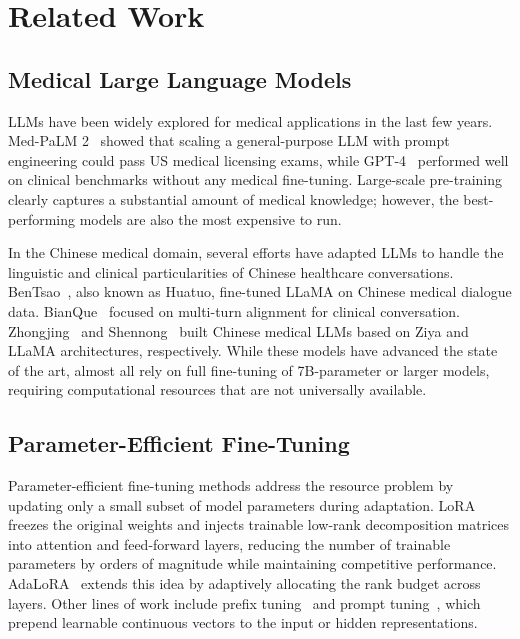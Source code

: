 \documentclass[12pt,a4paper]{article}
\begin{document}
\section{Related Work}
\label{sec:related}

\subsection{Medical Large Language Models}

LLMs have been widely explored for medical applications in the last few years. Med-PaLM 2~\cite{singhal2023medpalm} showed that scaling a general-purpose LLM with prompt engineering could pass US medical licensing exams, while GPT-4~\cite{nori2023gpt4} performed well on clinical benchmarks without any medical fine-tuning. Large-scale pre-training clearly captures a substantial amount of medical knowledge; however, the best-performing models are also the most expensive to run.

In the Chinese medical domain, several efforts have adapted LLMs to handle the linguistic and clinical particularities of Chinese healthcare conversations. BenTsao~\cite{wang2023bentsao}, also known as Huatuo, fine-tuned LLaMA on Chinese medical dialogue data. BianQue~\cite{chen2023bianque} focused on multi-turn alignment for clinical conversation. Zhongjing~\cite{yang2023zhongjing} and Shennong~\cite{shennong2023} built Chinese medical LLMs based on Ziya and LLaMA architectures, respectively. While these models have advanced the state of the art, almost all rely on full fine-tuning of 7B-parameter or larger models, requiring computational resources that are not universally available.

\subsection{Parameter-Efficient Fine-Tuning}

Parameter-efficient fine-tuning methods address the resource problem by updating only a small subset of model parameters during adaptation. LoRA~\cite{hu2021lora} freezes the original weights and injects trainable low-rank decomposition matrices into attention and feed-forward layers, reducing the number of trainable parameters by orders of magnitude while maintaining competitive performance. AdaLoRA~\cite{zhang2023adalora} extends this idea by adaptively allocating the rank budget across layers. Other lines of work include prefix tuning~\cite{li2021prefix} and prompt tuning~\cite{lester2021prompt}, which prepend learnable continuous vectors to the input or hidden representations.
\end{document}
